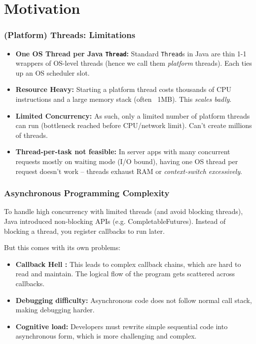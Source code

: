 \documentclass[xcolor={dvipsnames,svgnames},aspectratio=169]{beamer}
\begin{document}
\section{Motivation}

\begin{frame}[fragile]
  \frametitle{(Platform) Threads: Limitations}

  \begin{itemize}
  \item[\faBook]<1-> \textbf{One OS Thread per Java \texttt{Thread}:}
    Standard \texttt{Thread}s in Java are thin 1-1 wrappers of OS-level threads
    (hence we call them \emph{platform} threads). Each ties up an OS scheduler
    slot.
  \item[\faBook]<2-> \textbf{Resource Heavy:} Starting a platform thread costs
    thousands of CPU instructions and a large memory stack (often ~1MB). This
    \emph{scales badly}.
  \item[\faBook]<3-> \textbf{Limited Concurrency:} As such, only a limited number of
    platform threads can run (bottleneck reached before CPU/network limit).
    Can't create millions of threads.
  \item[\faBook]<4-> \textbf{Thread-per-task not feasible:} In server apps with
    many concurrent requests mostly on waiting mode (I/O bound), having one OS
    thread per request doesn't work -- threads exhaust RAM or
    \emph{context-switch excessively}.
  \end{itemize}
\end{frame}

\begin{frame}[fragile]
  \frametitle{Asynchronous Programming Complexity}

  To handle high concurrency with limited threads (and avoid blocking threads),
  Java introduced non-blocking APIs (e.g. CompletableFutures). Instead of
  blocking a thread, you register callbacks to run later.

  \pause
  But this comes with its own problems:
  \begin{itemize}
  \item[\faBook]<2-> \textbf{Callback Hell :}
    This leads to complex callback chains, which are hard to read and maintain. The
    logical flow of the program gets scattered across callbacks.
  \item[\faBook]<3-> \textbf{Debugging difficulty:} Asynchronous code does not
    follow normal call stack, making debugging harder.
  \item[\faBook]<4-> \textbf{Cognitive load:} Developers must rewrite simple
    sequential code into asynchronous form, which is more challenging and complex.
  \end{itemize}
\end{frame}
\end{document}
